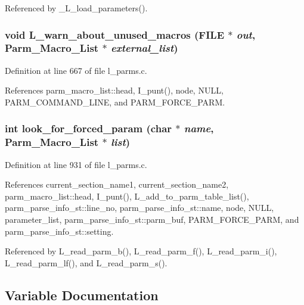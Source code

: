 Referenced by \_\-L\_\-load\_\-parameters().
\subsubsection{\setlength{\rightskip}{0pt plus 5cm}void L\_\-warn\_\-about\_\-unused\_\-macros (FILE $\ast$ {\em out}, \bf{Parm\_\-Macro\_\-List} $\ast$ {\em external\_\-list})}\label{l__parms_8c_da9f209c373bf33ecc8affd7d376b2d3}




Definition at line 667 of file l\_\-parms.c.

References parm\_\-macro\_\-list::head, I\_\-punt(), node, NULL, PARM\_\-COMMAND\_\-LINE, and PARM\_\-FORCE\_\-PARM.
\subsubsection{\setlength{\rightskip}{0pt plus 5cm}int look\_\-for\_\-forced\_\-param (char $\ast$ {\em name}, \bf{Parm\_\-Macro\_\-List} $\ast$ {\em list})}\label{l__parms_8c_4e81593e5d5157a86ef115b9b6049e64}




Definition at line 931 of file l\_\-parms.c.

References current\_\-section\_\-name1, current\_\-section\_\-name2, parm\_\-macro\_\-list::head, I\_\-punt(), L\_\-add\_\-to\_\-parm\_\-table\_\-list(), parm\_\-parse\_\-info\_\-st::line\_\-no, parm\_\-parse\_\-info\_\-st::name, node, NULL, parameter\_\-list, parm\_\-parse\_\-info\_\-st::parm\_\-buf, PARM\_\-FORCE\_\-PARM, and parm\_\-parse\_\-info\_\-st::setting.

Referenced by L\_\-read\_\-parm\_\-b(), L\_\-read\_\-parm\_\-f(), L\_\-read\_\-parm\_\-i(), L\_\-read\_\-parm\_\-lf(), and L\_\-read\_\-parm\_\-s().

\subsection{Variable Documentation}
